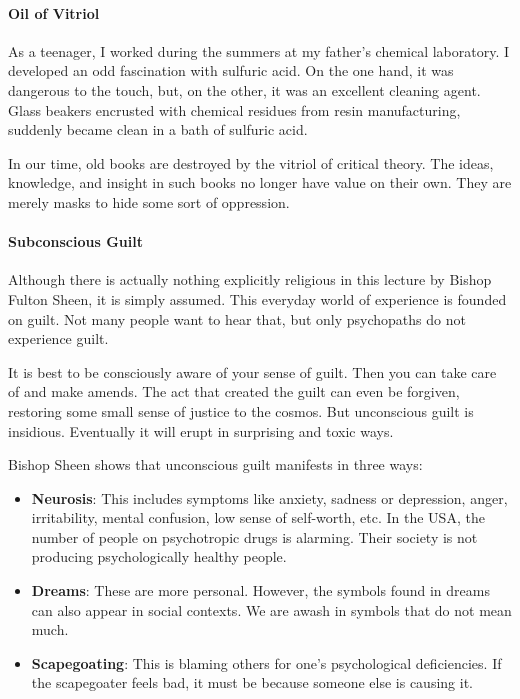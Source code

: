 \paragraph{Oil of Vitriol}


As a teenager, I worked during the summers at my father's chemical laboratory. I developed an odd fascination with sulfuric acid. On the one hand, it was dangerous to the touch, but, on the other, it was an excellent cleaning agent. Glass beakers encrusted with chemical residues from resin manufacturing, suddenly became clean in a bath of sulfuric acid.

In our time, old books are destroyed by the vitriol of critical theory. The ideas, knowledge, and insight in such books no longer have value on their own. They are merely masks to hide some sort of oppression.

\paragraph{Subconscious Guilt}


Although there is actually nothing explicitly religious in this lecture by Bishop Fulton Sheen, it is simply assumed. This everyday world of experience is founded on guilt. Not many people want to hear that, but only psychopaths do not experience guilt.

It is best to be consciously aware of your sense of guilt. Then you can take care of and make amends. The act that created the guilt can even be forgiven, restoring some small sense of justice to the cosmos. But unconscious guilt is insidious. Eventually it will erupt in surprising and toxic ways.

Bishop Sheen shows that unconscious guilt manifests in three ways:

\begin{itemize}
\item \textbf{Neurosis}: This includes symptoms like anxiety, sadness or depression, anger, irritability, mental confusion, low sense of self-worth, etc. In the USA, the number of people on psychotropic drugs is alarming. Their society is not producing psychologically healthy people.

\item \textbf{Dreams}: These are more personal. However, the symbols found in dreams can also appear in social contexts. We are awash in symbols that do not mean much.

\item \textbf{Scapegoating}: This is blaming others for one's psychological deficiencies. If the scapegoater feels bad, it must be because someone else is causing it.
\end{itemize}

